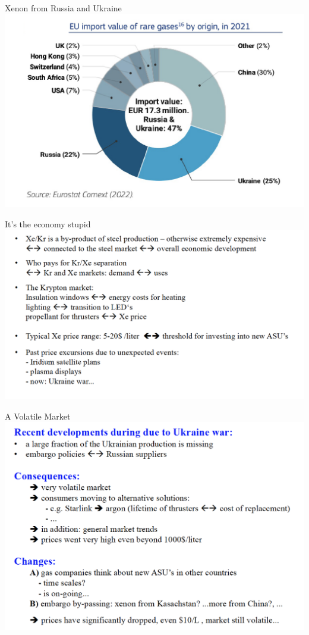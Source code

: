 \documentclass [aspectratio=169]{beamer}
\begin{document}
\begin{frame}{Xenon from Russia and Ukraine}
\includegraphics[scale=0.30]{gasFromRussia.png}
\end{frame}

\begin{frame}{It's the economy stupid}
\includegraphics[scale=0.30]{commercialxe.png}
\end{frame}

\begin{frame}{A Volatile Market}
\includegraphics[scale=0.25]{volatile.png}
\end{frame}
\end{document}
